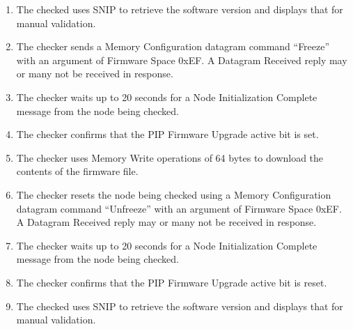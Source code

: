 \begin{enumerate}
\item The checked uses SNIP to retrieve the software version and displays that for manual 
    validation.
\item The checker sends a Memory Configuration datagram command “Freeze” with an 
    argument of Firmware Space 0xEF. 
    A Datagram Received reply may or many not be received in response.
\item The checker waits up to 20 seconds for a Node Initialization Complete message from the 
    node being checked.
\item The checker confirms that the PIP Firmware Upgrade active bit is set.
\item The checker uses Memory Write operations of 64 bytes to download the contents of the firmware file.
\item The checker resets the node being checked using a Memory Configuration 
    datagram command “Unfreeze” with an argument of Firmware Space 0xEF.    
    A Datagram Received reply may or many not be received in response.
\item The checker waits up to 20 seconds for a Node Initialization Complete message from the 
    node being checked.
\item The checker confirms that the PIP Firmware Upgrade active bit is reset.
\item The checked uses SNIP to retrieve the software version and displays that for manual 
    validation.
\end{enumerate}

  
